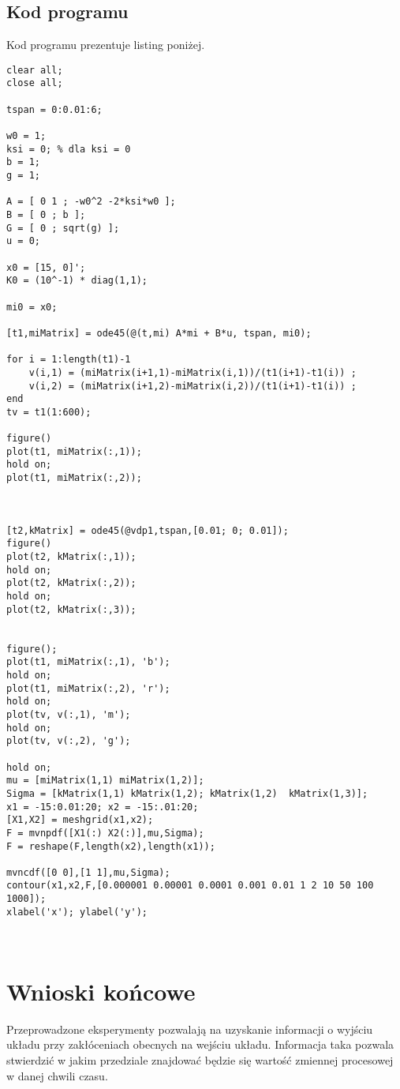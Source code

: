 \documentclass[a4paper,15pt]{article}
\begin{document}
\subsection{Kod programu}
Kod programu prezentuje listing poniżej.
\begin{lstlisting}[caption=Zadanie 1, captionpos=b,label=lis1, firstnumber=1,frame=single]
clear all;
close all;

tspan = 0:0.01:6;

w0 = 1;
ksi = 0; % dla ksi = 0
b = 1;
g = 1;

A = [ 0 1 ; -w0^2 -2*ksi*w0 ];
B = [ 0 ; b ];
G = [ 0 ; sqrt(g) ];
u = 0; 

x0 = [15, 0]';
K0 = (10^-1) * diag(1,1);

mi0 = x0;

[t1,miMatrix] = ode45(@(t,mi) A*mi + B*u, tspan, mi0);

for i = 1:length(t1)-1
    v(i,1) = (miMatrix(i+1,1)-miMatrix(i,1))/(t1(i+1)-t1(i)) ;
    v(i,2) = (miMatrix(i+1,2)-miMatrix(i,2))/(t1(i+1)-t1(i)) ;
end
tv = t1(1:600);

figure()
plot(t1, miMatrix(:,1));
hold on;
plot(t1, miMatrix(:,2));



[t2,kMatrix] = ode45(@vdp1,tspan,[0.01; 0; 0.01]);
figure()
plot(t2, kMatrix(:,1));
hold on;
plot(t2, kMatrix(:,2));
hold on;
plot(t2, kMatrix(:,3));


figure();
plot(t1, miMatrix(:,1), 'b');
hold on;
plot(t1, miMatrix(:,2), 'r');
hold on;
plot(tv, v(:,1), 'm');
hold on;
plot(tv, v(:,2), 'g');

hold on;
mu = [miMatrix(1,1) miMatrix(1,2)];
Sigma = [kMatrix(1,1) kMatrix(1,2); kMatrix(1,2)  kMatrix(1,3)];
x1 = -15:0.01:20; x2 = -15:.01:20;
[X1,X2] = meshgrid(x1,x2);
F = mvnpdf([X1(:) X2(:)],mu,Sigma);
F = reshape(F,length(x2),length(x1));

mvncdf([0 0],[1 1],mu,Sigma);
contour(x1,x2,F,[0.000001 0.00001 0.0001 0.001 0.01 1 2 10 50 100 1000]);
xlabel('x'); ylabel('y');



\end{lstlisting}

\section{Wnioski końcowe}
Przeprowadzone eksperymenty pozwalają na uzyskanie informacji o wyjściu układu przy zakłóceniach obecnych na wejściu układu. Informacja taka pozwala stwierdzić w jakim przedziale znajdować będzie się wartość zmiennej procesowej w danej chwili czasu. 

 
\end{document}
